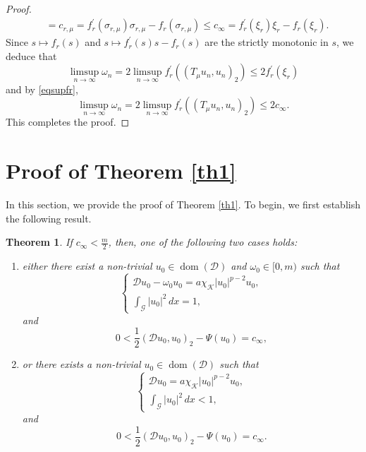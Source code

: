 \documentclass[11pt]{amsart}
\newtheorem{theorem}{Theorem}[section]
\newcommand{\abs}[1]{\lvert#1\rvert}
\newcommand{\D}{\mathcal{D}}
\newcommand{\G}{\mathcal{G}}
\newcommand{\K}{\mathcal{K}}
\numberwithin{equation}{section}
\begin{document}
\begin{proof}
$$\begin{aligned}
& =c_{r, \mu}=f_{r}^{\prime}(\sigma_{r, \mu}) \sigma_{r, \mu}-f_{r}(\sigma_{r, \mu}) \leq c_{\infty}=f_{r}^{\prime}(\xi_{r}) \xi_{r}-f_{r}(\xi_{r}).
\end{aligned}
$$
Since  $s \mapsto f_{r}(s)$ and  $s \mapsto f_{r}^{\prime}(s) s-f_{r}(s)$ are the strictly monotonic in $s$, we deduce that
$$
\limsup _{n \rightarrow \infty} \omega_{n}=2 \limsup _{n \rightarrow \infty} f_{r}^{\prime}\left(\left(T_{\mu} u_{n}, u_{n}\right)_{2}\right) \leq 2 f_{r}^{\prime}\left(\xi_{r}\right)
$$
and by \eqref{eqsupfr},
$$
\limsup _{n \rightarrow \infty} \omega_{n}=2 \limsup _{n \rightarrow \infty} f_{r}^{\prime}\left(\left(T_{\mu} u_{n}, u_{n}\right)_{2}\right) \leq 2 c_{\infty}.
$$
This completes the proof.
\end{proof}
\section{Proof of Theorem \ref{th1}}\label{sect3}
In this section, we provide the proof of Theorem \ref{th1}. To begin, we first establish the following result.
\begin{theorem}\label{th31}
If $c_\infty<\frac{m}{2}$, then, one of the following two cases holds:
\begin{enumerate}[label=\rm(\roman*)]
\item either there exist a non-trivial $u_{0} \in \operatorname{dom}(\D)$ and $\omega_{0} \in[0, m)$ such that
$$
\left\{\begin{array}{l}
\D u_{0}-\omega_{0} u_{0}=a\chi_{\K}\abs{u_{0}}^{p-2} u_{0},\\
\int_{\G}\left|u_{0}\right|^{2} \,dx = 1,
\end{array}\right.
$$
and
$$
0<\frac{1}{2}(\D u_{0}, u_{0})_{2}-\Psi(u_{0})=c_{\infty},
$$
\item or there exists a non-trivial $u_{0} \in \operatorname{dom}(\D)$ such that
$$
\left\{\begin{array}{l}
\D u_{0}=a\chi_{\K}\abs{u_{0}}^{p-2} u_{0}, \\
\int_{\G}\left|u_{0}\right|^{2} \,dx < 1,
\end{array}\right.
$$
and
$$
0<\frac{1}{2}(\D u_{0}, u_{0})_{2}-\Psi(u_{0})=c_{\infty}.
$$
\end{enumerate}
\end{theorem}
\end{document}
